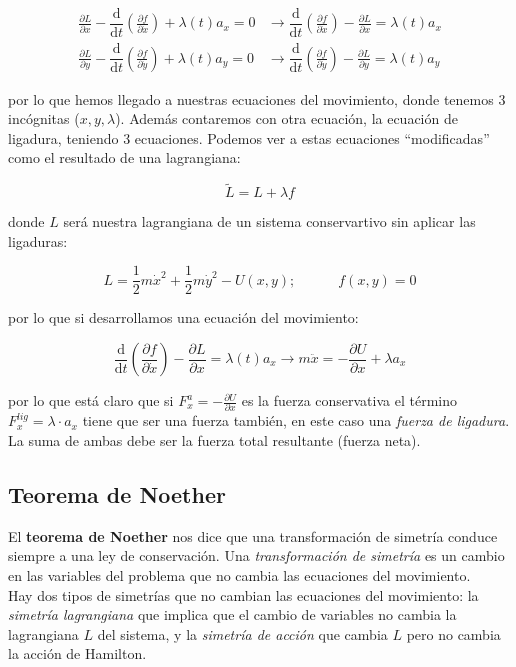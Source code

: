 \documentclass[12pt,a4paper]{book}
\newcommand{\parentesis}[1]{\left( #1  \right)}
\newcommand{\parciales}[2]{\frac{\partial #1}{\partial #2}}
\newcommand{\D}{\mathrm{d}}
\newcommand{\tquad}{\quad \quad \quad}
\begin{document}
\begin{align}
\parciales{L}{x} - \dfrac{\D}{\D t} \parentesis{\parciales{f}{\dot{x}}} + \lambda(t) a_x = 0 & \longrightarrow   \dfrac{\D}{\D t} \parentesis{\parciales{f}{\dot{x}}} - \parciales{L}{x} = \lambda(t) a_x   \\
\parciales{L}{y} - \dfrac{\D}{\D t} \parentesis{\parciales{f}{\dot{y}}} + \lambda(t) a_y = 0 & \longrightarrow  \dfrac{\D}{\D t} \parentesis{\parciales{f}{\dot{y}}} - \parciales{L}{y} = \lambda(t) a_y
\end{align}

por lo que hemos llegado a nuestras ecuaciones del movimiento, donde tenemos 3 incógnitas ($x,y,\lambda$). Además contaremos con otra ecuación, la ecuación de ligadura, teniendo 3 ecuaciones. Podemos ver a estas ecuaciones ``modificadas'' como el resultado de una lagrangiana:

$$ \widetilde{L} = L + \lambda f $$

donde $L$ será nuestra lagrangiana de un sistema conservartivo sin aplicar las ligaduras:

\begin{equation}
L = \frac{1}{2} m \dot{x}^2 + \frac{1}{2} m \dot{y}^2 - U(x,y); \tquad f(x,y)=0
\end{equation}

por lo que si desarrollamos una ecuación del movimiento:

$$\dfrac{\D}{\D t} \parentesis{\parciales{f}{\dot{x}}} - \parciales{L}{x} = \lambda(t) a_x  \longrightarrow m \ddot{x} = - \parciales{U}{x} + \lambda a_x $$

por lo que está claro que si $F_x^a = -\parciales{U}{x}$ es la fuerza conservativa el término $F_x^{lig} = \lambda \cdot a_x$ tiene que ser una fuerza también, en este caso una \textit{fuerza de ligadura}. La suma de ambas debe ser la fuerza total resultante (fuerza neta).


\subsection{Teorema de Noether}

El \textbf{teorema de Noether} nos dice que una transformación de simetría conduce siempre a una ley de conservación. Una \textit{transformación de simetría} es un cambio en las variables del problema que no cambia las ecuaciones del movimiento. \\

Hay dos tipos de simetrías que no cambian las ecuaciones del movimiento: la \textit{simetría lagrangiana} que implica que el cambio de variables no cambia la lagrangiana $L$ del sistema, y la \textit{simetría de acción} que cambia $L$ pero no cambia la acción de Hamilton. \\
\end{document}
